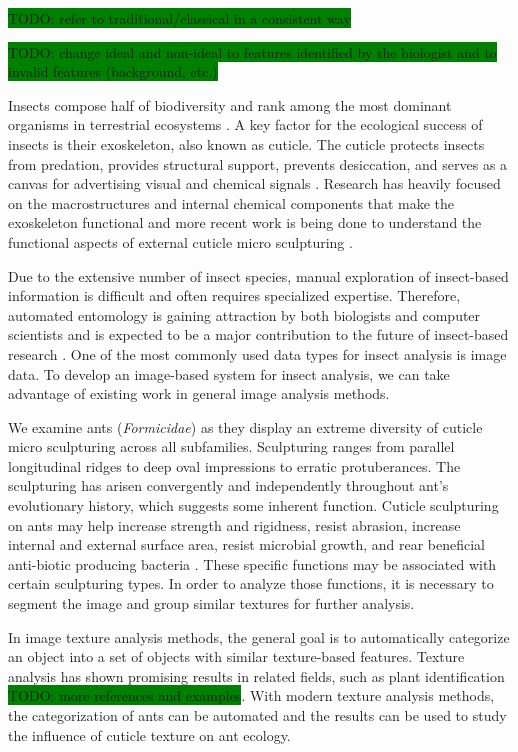 \documentclass{aci}
\numberwithin{equation}{section}
\begin{document}
\colorbox{green}{TODO: refer to traditional/classical in a consistent way}

\colorbox{green}{TODO: change ideal and non-ideal to features identified by
    the biologist and to invalid features (background, etc.)}

Insects compose half of biodiversity and rank among the most dominant organisms
in terrestrial ecosystems \cite{sheikh_diverse_2017}. A key factor for the
ecological success of insects is their exoskeleton, also known as cuticle. The
cuticle protects insects from predation, provides structural support, prevents
desiccation, and serves as a canvas for advertising visual and chemical signals
\cite{gullan_insects_2009}. Research has heavily focused on the macrostructures
and internal chemical components that make the exoskeleton functional and more
recent work is being done to understand the functional aspects of external
cuticle micro sculpturing \cite{muthukrishnan_insect_2020,
    gunderson_insect_1989, watson_diversity_2017}.

Due to the extensive number of insect species, manual exploration of
insect-based information is difficult and often requires specialized expertise.
Therefore, automated entomology is gaining attraction by both biologists and
computer scientists and is expected to be a major contribution to the future of
insect-based research \cite{martineau_survey_2017}. One of the most commonly
used data types for insect analysis is image data. To develop an image-based
system for insect analysis, we can take advantage of existing work in general
image analysis methods.

We examine ants (\textit{Formicidae}) as they display an extreme diversity of
cuticle micro sculpturing across all subfamilies. Sculpturing ranges from
parallel longitudinal ridges to deep oval impressions to erratic protuberances.
The sculpturing has arisen convergently and independently throughout ant's
evolutionary history, which suggests some inherent function. Cuticle sculpturing
on ants may help increase strength and rigidness, resist abrasion, increase
internal and external surface area, resist microbial growth, and rear beneficial
anti-biotic producing bacteria \cite{johnson_effect_2011,
    bruckner_relationship_2017, currie_coevolved_2006}. These specific functions may
be associated with certain sculpturing types. In order to analyze those
functions, it is necessary to segment the image and group similar textures for
further analysis.

In image texture analysis methods, the general goal is to automatically
categorize an object into a set of objects with similar texture-based features.
Texture analysis has shown promising results in related fields, such as plant
identification \cite{boudra_plant_2018} \colorbox{green}{TODO: more references
    and examples}. With modern texture analysis methods, the categorization of ants
can be automated and the results can be used to study the influence of cuticle
texture on ant ecology.
\end{document}

